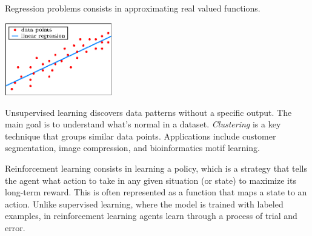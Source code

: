 \documentclass[10pt, letterpaper]{report}
\begin{document}
Regression problems consists in approximating real valued functions.
\begin{center}
	\includegraphics[width=0.35\textwidth]{images/regression.eps}
\end{center}
Unsupervised learning discovers data patterns without a specific output. The main goal is to understand what's normal in a dataset. \textit{Clustering} is a key technique that groups similar data points. Applications include customer segmentation, image compression, and bioinformatics motif learning.\bigskip

Reinforcement learning consists in learning a policy, which is a strategy that tells the agent what action to take in any given situation (or state) to maximize its long-term reward. This is often represented as a function that maps a state to an action. Unlike supervised learning, where the model is trained with labeled examples, in reinforcement learning agents learn through a process of trial and error.\bigskip
\end{document}
